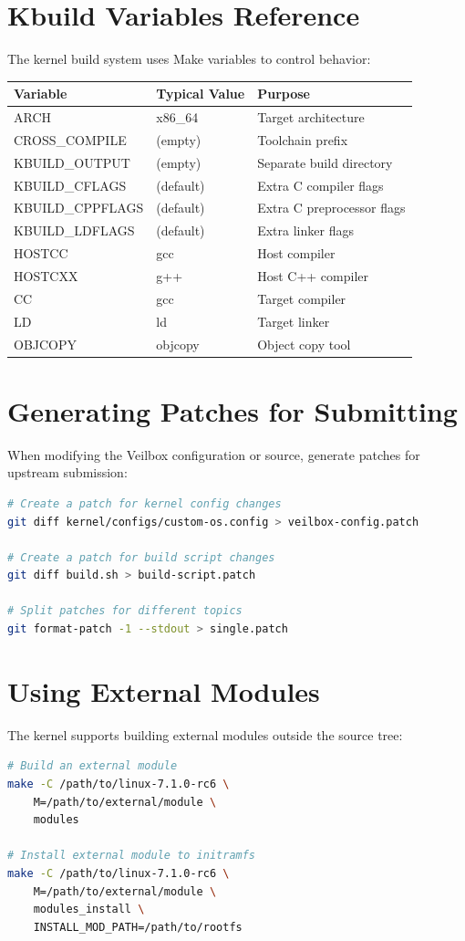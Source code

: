 \section{Kbuild Variables Reference}

The kernel build system uses Make variables to control behavior:

\begin{longtable}{|p{4cm}|p{4cm}|p{4cm}|}
\hline
\textbf{Variable} & \textbf{Typical Value} & \textbf{Purpose} \\
\hline
ARCH & x86\_64 & Target architecture \\
CROSS\_COMPILE & (empty) & Toolchain prefix \\
KBUILD\_OUTPUT & (empty) & Separate build directory \\
KBUILD\_CFLAGS & (default) & Extra C compiler flags \\
KBUILD\_CPPFLAGS & (default) & Extra C preprocessor flags \\
KBUILD\_LDFLAGS & (default) & Extra linker flags \\
HOSTCC & gcc & Host compiler \\
HOSTCXX & g++ & Host C++ compiler \\
CC & gcc & Target compiler \\
LD & ld & Target linker \\
OBJCOPY & objcopy & Object copy tool \\
\hline
\end{longtable}

\section{Generating Patches for Submitting}

When modifying the Veilbox configuration or source, generate patches
for upstream submission:

\begin{lstlisting}[language=bash]
# Create a patch for kernel config changes
git diff kernel/configs/custom-os.config > veilbox-config.patch

# Create a patch for build script changes
git diff build.sh > build-script.patch

# Split patches for different topics
git format-patch -1 --stdout > single.patch
\end{lstlisting}

\section{Using External Modules}

The kernel supports building external modules outside the source tree:

\begin{lstlisting}[language=bash]
# Build an external module
make -C /path/to/linux-7.1.0-rc6 \
    M=/path/to/external/module \
    modules

# Install external module to initramfs
make -C /path/to/linux-7.1.0-rc6 \
    M=/path/to/external/module \
    modules_install \
    INSTALL_MOD_PATH=/path/to/rootfs
\end{lstlisting}
